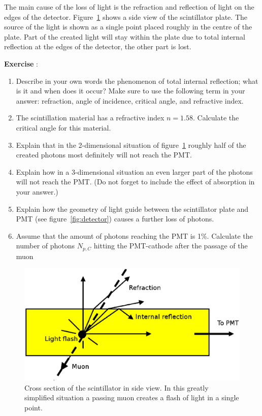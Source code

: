 \documentclass[12pt,a4paper]{article}
\numberwithin{equation}{section}
\numberwithin{figure}{section}
\newcounter{Exercise}
\numberwithin{table}{section}
\begin{document}
The main cause of the loss of light is the refraction and reflection of light on the edges of the detector. Figure~\ref{fig:refraction} shows a side view of the scintillator plate. The source of the light is shown as a single point placed roughly in the centre of the plate. Part of the created light will stay within the plate due to total internal reflection at the edges of the detector, the other part is lost.

\begin{shaded}
\textbf{Exercise \theExercise {}} :
\begin{enumerate}[-]
\item Describe in your own words the phenomenon of total internal reflection; what is it and when does it occur? Make sure to use the following term in your answer: refraction, angle of incidence, critical angle, and refractive index.
\item The scintillation material has a refractive index $n=1.58$. Calculate the critical angle for this material.
\item Explain that in the 2-dimensional situation of figure~\ref{fig:refraction} roughly half of the created photons most definitely will not reach the PMT.
\item Explain how in a 3-dimensional situation an even larger part of the photons will not reach the PMT. (Do not forget to include the effect of absorption in your answer.)
\item Explain how the geometry of light guide between the scintillator plate and PMT (see figure~\ref{fig:detector}) causes a further loss of photons.
\item Assume that the amount of photons reaching the PMT is 1\%. Calculate the number of photons $N_{p,C}$ hitting the PMT-cathode after the passage of the muon
\end{enumerate}
\end{shaded}

\begin{figure}\begin{center}
\includegraphics[scale=0.5]{refraction.eps}%
\caption{Cross section of the scintillator in side view. In this greatly simplified situation a passing muon creates a flash of light in a single point.}\label{fig:refraction}
\end{center}\end{figure}
\end{document}
